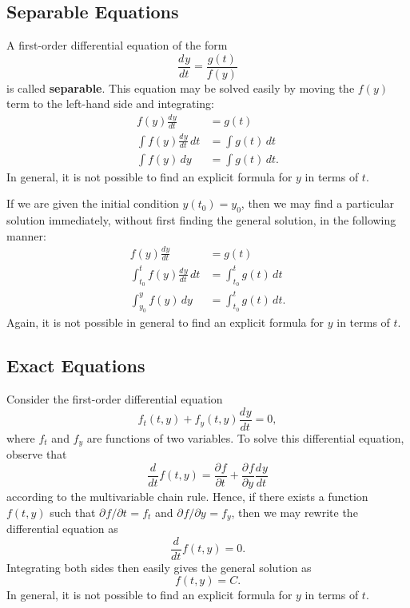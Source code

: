 \documentclass{myart}
\newcommand{\term}[1]{\textbf{#1}}
\newcommand{\deriv}[3][]{\frac{d^{#1}#2}{d#3^{#1}}}
\newcommand{\pderiv}[3][]{\frac{\partial^{#1}#2}{\partial#3^{#1}}}
\newcommand{\fpderiv}[3][]{\partial^{#1}#2/\partial#3^{#1}}
\begin{document}
\subsection{Separable Equations} \label{subsec:separable}

A first-order differential equation of the form
\begin{equation*}
\deriv{y}{t} = \frac{g(t)}{f(y)}
\end{equation*}
is called \term{separable}. This equation may be solved easily by moving the $f(y)$ term to the left-hand side and integrating:
\begin{align*}
f(y) \deriv{y}{t} &= g(t) \\
\int f(y) \deriv{y}{t} \,dt &= \int g(t) \,dt \\
\int f(y) \,dy &= \int g(t) \,dt.
\end{align*}
In general, it is not possible to find an explicit formula for $y$ in terms of $t$.

If we are given the initial condition $y(t_0) = y_0$, then we may find a particular solution immediately, without first finding the general solution, in the following manner:
\begin{align*}
f(y) \deriv{y}{t} &= g(t) \\
\int_{t_0}^t f(y) \deriv{y}{t} \,dt &= \int_{t_0}^t g(t) \,dt \\
\int_{y_0}^y f(y) \,dy &= \int_{t_0}^t g(t) \,dt.
\end{align*}
Again, it is not possible in general to find an explicit formula for $y$ in terms of $t$.

\subsection{Exact Equations} \label{subsec:exact}

Consider the first-order differential equation
\begin{equation*}
f_t(t, y) + f_y(t, y) \deriv{y}{t} = 0,
\end{equation*}
where $f_t$ and $f_y$ are functions of two variables. To solve this differential equation, observe that
\begin{equation*}
\deriv{}{t} f(t, y) = \pderiv{f}{t} + \pderiv{f}{y} \deriv{y}{t}
\end{equation*}
according to the multivariable chain rule. Hence, if there exists a function $f(t, y)$ such that $\fpderiv{f}{t} = f_t$ and $\fpderiv{f}{y} = f_y$, then we may rewrite the differential equation as
\begin{equation*}
\deriv{}{t} f(t, y) = 0.
\end{equation*}
Integrating both sides then easily gives the general solution as
\begin{equation*}
f(t, y) = C.
\end{equation*}
In general, it is not possible to find an explicit formula for $y$ in terms of $t$.
\end{document}
